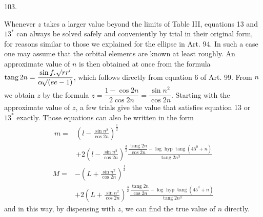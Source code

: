 \par{}\medskip
\hypertarget{native-142-article103}{}
\begin{center}103.\end{center}
Whenever $z$ takes a larger value beyond the limits of Table III, equations 13 and $13^*$ can always be solved safely and conveniently by trial in their original form, for reasons similar to those we explained for the ellipse in Art. 94. In such a case one may assume that the orbital elements are known at least roughly. An approximate value of $n$ is then obtained at once from the formula $\operatorname{tang}2n=\dfrac{\sin f\mathpunct{.}\mathord{{}^{}\!\surd}rr'}{\alpha\mathord{{}^{}\!\surd}(ee-1)}$, which follows directly from equation 6 of Art. 99. From $n$ we obtain $z$ by the formula $z=\dfrac{1-\cos2n}{2\cos2n}=\dfrac{\sin n^2}{\cos2n}$. Starting with the approximate value of $z$, a few trials give the value that satisfies equation 13 or $13^*$ exactly. Those equations can also be written in the form
\[
\begin{aligned}
m={}&\left(l-\frac{\sin n^2}{\cos2n}\right)^{\frac12}\\[.6em]
&+2\left(l-\frac{\sin n^2}{\cos2n}\right)^{\frac32}\frac{\dfrac{\operatorname{tang}2n}{\cos2n}-\log\operatorname{hyp}\operatorname{tang}(45^0+n)}{\operatorname{tang}2n^3}
\end{aligned}
\]
\[
\begin{aligned}
M={}&-\left(L+\frac{\sin n^2}{\cos2n}\right)^{\frac12}\\[.6em]
&+2\left(L+\frac{\sin n^2}{\cos2n}\right)^{\frac32}\frac{\dfrac{\operatorname{tang}2n}{\cos2n}-\log\operatorname{hyp}\operatorname{tang}(45^0+n)}{\operatorname{tang}2n^3}
\end{aligned}
\]
\noindent and in this way, by dispensing with $z$, we can find the true value of $n$ directly.
